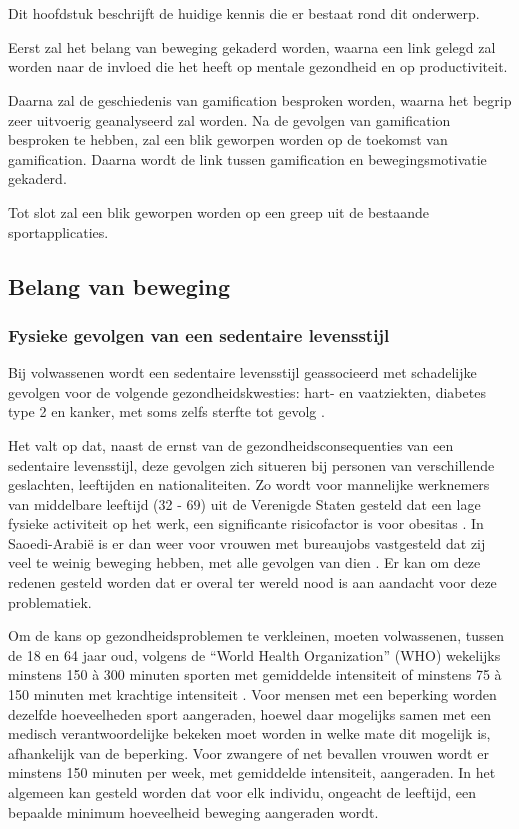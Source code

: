 \chapter{}%
\label{ch:stand-van-zaken}

Dit hoofdstuk beschrijft de huidige kennis die er bestaat rond dit onderwerp.

Eerst zal het belang van beweging gekaderd worden, waarna een link gelegd zal worden naar de invloed die het heeft op mentale gezondheid en op productiviteit.

Daarna zal de geschiedenis van gamification besproken worden, waarna het begrip zeer uitvoerig geanalyseerd zal worden. Na de gevolgen van gamification besproken te hebben, zal een blik geworpen worden op de toekomst van gamification. Daarna wordt de link tussen gamification en bewegingsmotivatie gekaderd.

Tot slot zal een blik geworpen worden op een greep uit de bestaande sportapplicaties.

\section{Belang van beweging}

\subsection{Fysieke gevolgen van een sedentaire levensstijl}
\label{ssec:fysieke-gevolgen}
Bij volwassenen wordt een sedentaire levensstijl geassocieerd met schadelijke gevolgen voor de volgende gezondheidskwesties: hart- en vaatziekten, diabetes type 2 en kanker, met soms zelfs sterfte tot gevolg \autocite{Bull2020}.

Het valt op dat, naast de ernst van de gezondheidsconsequenties van een sedentaire levensstijl, deze gevolgen zich situeren bij personen van verschillende geslachten, leeftijden en nationaliteiten. Zo wordt voor mannelijke werknemers van middelbare leeftijd (32 - 69) uit de Verenigde Staten gesteld dat een lage fysieke activiteit op het werk, een significante risicofactor is voor obesitas \autocite{Choi2010}. In Saoedi-Arabië is er dan weer voor vrouwen met bureaujobs vastgesteld dat zij veel te weinig beweging hebben, met alle gevolgen van dien \autocite{Albawardi2017}. Er kan om deze redenen gesteld worden dat er overal ter wereld nood is aan aandacht voor deze problematiek.

Om de kans op gezondheidsproblemen te verkleinen, moeten volwassenen, tussen de 18 en 64 jaar oud, volgens de ``World Health Organization'' (WHO) wekelijks minstens 150 à 300 minuten sporten met gemiddelde intensiteit of minstens 75 à 150 minuten met krachtige intensiteit \autocite{Bull2020}. Voor mensen met een beperking worden dezelfde hoeveelheden sport aangeraden, hoewel daar mogelijks samen met een medisch verantwoordelijke bekeken moet worden in welke mate dit mogelijk is, afhankelijk van de beperking. Voor zwangere of net bevallen vrouwen wordt er minstens 150 minuten per week, met gemiddelde intensiteit, aangeraden. In het algemeen kan gesteld worden dat voor elk individu, ongeacht de leeftijd, een bepaalde minimum hoeveelheid beweging aangeraden wordt.

